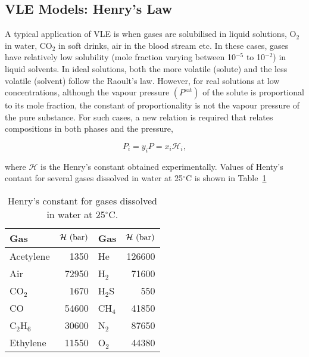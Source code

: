 \subsection{VLE Models: Henry's Law}\label{Chapter:VLE:Section:HenryLaw}

A typical application of VLE is when gases are solubilised in liquid solutions, \eg O$_{2}$ in water, CO$_{2}$ in soft drinks, air in the blood stream etc. In these cases, gases have relatively low solubility (mole fraction varying between 10$^{-5}$ to 10$^{-2}$) in liquid solvents. In ideal solutions, both the more volatile (\ie solute) and the less volatile (\ie solvent) follow the Raoult’s law. However, for real solutions at low concentrations, although the vapour pressure $\left(P^{\text{sat}}\right)$ of the solute is proportional to its mole fraction, the constant of proportionality is not the vapour pressure of the pure substance. For such cases, a new relation is required that relates compositions in both phases and the pressure,
\begin{shaded}
  \begin{equation}
      P_{i} = y_{i}P = x_{i}\mathcal{H}_{i},\label{Chapter:VLE:Eqn:HenryLaw} 
  \end{equation}
\end{shaded}
\noindent where $\mathcal{H}$ is the Henry's constant obtained experimentally. Values of Henty's contant for several gases dissolved in water at 25$^{\circ}$C is shown in Table~\ref{Chapter:VLE:Table:HenryLawTable}
 \begin{table}
  \begin{center}
    \begin{tabular}{l r || l r }
      \hline
       {\bf Gas}    &  ${\bf \mathcal{H}\text{ (bar)}}$ & {\bf Gas}    &  ${\bf \mathcal{H}\text{ (bar)}}$ \\
      \hline
         Acetylene  &   1350                            & He           &  126600 \\
         Air        &   72950                           & H$_{2}$      &  71600  \\
         CO$_{2}$    & 1670                              & H$_{2}$S     & 550 \\
         CO         &  54600                            &  CH$_{4}$    &  41850 \\
         C$_{2}$H$_{6}$ & 30600                          &  N$_{2}$     & 87650  \\
         Ethylene  & 11550                              & O$_{2}$      & 44380 \\
      \hline
    \end{tabular}
    \caption{Henry's constant for gases dissolved in water at 25$^{\circ}$C.}\label{Chapter:VLE:Table:HenryLawTable}
  \end{center}
\end{table}

